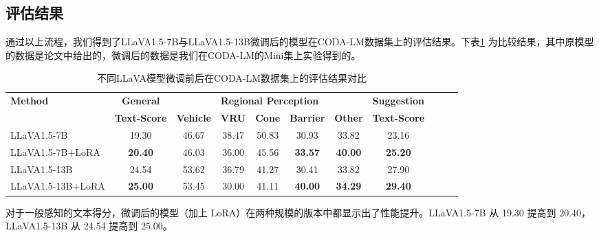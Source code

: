 \documentclass[
    linespread = 1.25
]{ctexart}
\begin{document}
\subsection{评估结果}
通过以上流程，我们得到了LLaVA1.5-7B与LLaVA1.5-13B微调后的模型在CODA-LM数据集上的评估结果。下表\ref{CODA-LM result}
为比较结果，其中原模型的数据是论文\cite{chen2024automatedevaluationlargevisionlanguage}中给出的，微调后的数据是我们在CODA-LM的Mini集上实验得到的。

\begin{table}[htbp]
  \centering
  \caption{不同LLaVA模型微调前后在CODA-LM数据集上的评估结果对比}
  \label{CODA-LM result}
  \small %
  \begin{tabular}{lcccccccccc}
    \toprule
    \textbf{Method}   & \textbf{General}   & \multicolumn{5}{c}{\textbf{Regional Perception}} & \textbf{Suggestion}                                                                           \\
    \cmidrule(r){3-7}
                      & \textbf{Text-Score} & \textbf{Vehicle}                                  & \textbf{VRU}         & \textbf{Cone} & \textbf{Barrier} & \textbf{Other} & \textbf{Text-Score} \\
    \midrule
    LLaVA1.5-7B       & 19.30               & 46.67                                             & 38.47                & 50.83         & 30.93            & 33.82          & 23.16               \\
    LLaVA1.5-7B+LoRA  & \textbf{20.40}      & 46.03                                             & 36.00                & 45.56         & \textbf{33.57}   & \textbf{40.00} & \textbf{25.20}      \\
    \midrule
    LLaVA1.5-13B      & 24.54               & 53.62                                             & 36.79                & 41.27         & 30.41            & 33.82          & 27.90               \\
    LLaVA1.5-13B+LoRA & \textbf{25.00}      & 53.45                                             & 30.00                & 41.11         & \textbf{40.00}   & \textbf{34.29} & \textbf{29.40}      \\
    \bottomrule
  \end{tabular}
\end{table}

对于一般感知的文本得分，微调后的模型（加上 LoRA）在两种规模的版本中都显示出了性能提升。LLaVA1.5-7B 从 19.30 提高到 20.40，LLaVA1.5-13B 从 24.54 提高到 25.00。
\end{document}
